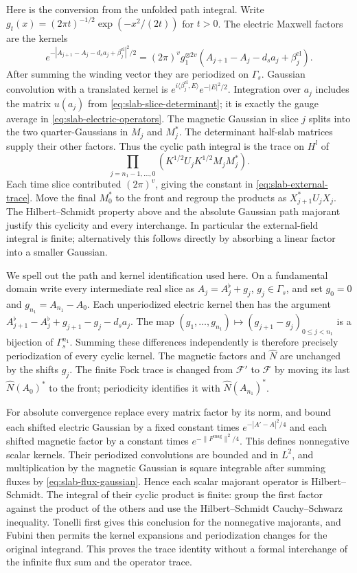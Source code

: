 Here is the conversion from the unfolded path integral. Write
$g_t(x)=(2\pi t)^{-1/2}\exp(-x^2/(2t))$ for $t>0$. The electric
Maxwell factors are the kernels
\[
 e^{-|A_{j+1}-A_j-d_sa_j+\beta_j^{\mathrm{el}}|^2/2}
       =(2\pi)^v g_1^{\otimes 2v}
                       (A_{j+1}-A_j-d_sa_j+\beta_j^{\mathrm{el}}).
\]
After summing the winding vector they are periodized on $\Gamma_s$.
Gaussian convolution with a translated kernel is
$e^{i\langle\beta_j^{\mathrm{el}},E\rangle}e^{-|E|^2/2}$.
Integration over $a_j$ includes the matrix $u(a_j)$ from
\eqref{eq:slab-slice-determinant}; it is exactly the gauge average in
\eqref{eq:slab-electric-operators}. The magnetic Gaussian in slice
$j$ splits into the two quarter-Gaussians in $M_j$ and $M_j^*$.
The determinant half-slab matrices supply their other factors.
Thus the cyclic path integral is the trace on $H^l$ of
\[
 \prod_{j=n_1-1,\ldots,0}
       (K^{1/2}U_jK^{1/2}M_jM_j^*).
\]
Each time slice contributed $(2\pi)^v$, giving the constant in
\eqref{eq:slab-external-trace}. Move the final $M_0^*$ to the front
and regroup the products as $X_{j+1}^*U_jX_j$. The
Hilbert--Schmidt property above and the absolute Gaussian path
majorant justify this cyclicity and every interchange. In particular
the external-field integral is finite; alternatively this follows
directly by absorbing a linear factor into a smaller Gaussian.

We spell out the path and kernel identification used here. On a
fundamental domain write every intermediate real slice as
$A_j=A_j^\flat+g_j$, $g_j\in\Gamma_s$, and set $g_0=0$ and
$g_{n_1}=A_{n_1}-A_0$. Each unperiodized electric kernel then has
the argument
$A_{j+1}^\flat-A_j^\flat+g_{j+1}-g_j-d_sa_j$.
The map $(g_1,\ldots,g_{n_1})\mapsto
(g_{j+1}-g_j)_{0\le j<n_1}$ is a bijection of $\Gamma_s^{n_1}$.
Summing these differences independently is therefore precisely
periodization of every cyclic kernel. The magnetic factors and
$\widehat N$ are unchanged by the shifts $g_j$. The finite Fock trace
is changed from $\mathcal F'$ to $\mathcal F$ by moving its last
$\widehat N(A_0)^*$ to the front; periodicity identifies it with
$\widehat N(A_{n_1})^*$.

For absolute convergence replace every matrix factor by its norm,
and bound each shifted electric Gaussian by a fixed constant times
$e^{-|A'-A|^2/4}$ and each shifted magnetic factor by a constant
times $e^{-\|F^{\mathrm{mag}}\|^2/4}$. This defines nonnegative
scalar kernels. Their periodized convolutions are bounded and in
$L^2$, and multiplication by the magnetic Gaussian is square
integrable after summing fluxes by \eqref{eq:slab-flux-gaussian}.
Hence each scalar majorant operator is Hilbert--Schmidt. The
integral of their cyclic product is finite: group the first factor
against the product of the others and use the Hilbert--Schmidt
Cauchy--Schwarz inequality. Tonelli first gives this conclusion
for the nonnegative majorants, and Fubini then permits the kernel
expansions and periodization changes for the original integrand.
This proves the trace identity without a formal interchange of
the infinite flux sum and the operator trace.

